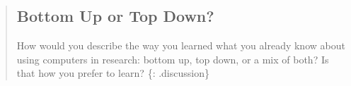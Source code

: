 \begin{quote}
\subsection{Bottom Up or Top Down?}\label{bottom-up-or-top-down}

How would you describe the way you learned what you already know about
using computers in research: bottom up, top down, or a mix of both? Is
that how you prefer to learn? \{: .discussion\}
\end{quote}
